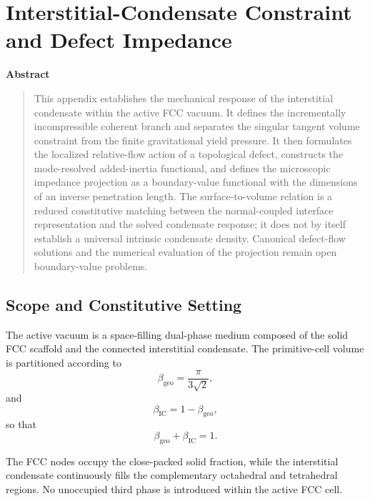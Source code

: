 \chapter[FCC Condensate Constraint and Defect Impedance]{Interstitial-Condensate Constraint and Defect Impedance}
\label{app:condensate_impedance}

\vspace{1em}
\begin{center}
    \textbf{Abstract}
\end{center}
\begin{quote}
\noindent This appendix establishes the mechanical response of the interstitial condensate within the active FCC vacuum. It defines the incrementally incompressible coherent branch and separates the singular tangent volume constraint from the finite gravitational yield pressure. It then formulates the localized relative-flow action of a topological defect, constructs the mode-resolved added-inertia functional, and defines the microscopic impedance projection as a boundary-value functional with the dimensions of an inverse penetration length. The surface-to-volume relation is a reduced constitutive matching between the normal-coupled interface representation and the solved condensate response; it does not by itself establish a universal intrinsic condensate density. Canonical defect-flow solutions and the numerical evaluation of the projection remain open boundary-value problems.
\end{quote}
\vspace{2em}

\section{Scope and Constitutive Setting}

The active vacuum is a space-filling dual-phase medium composed of the solid FCC scaffold and the connected interstitial condensate. The primitive-cell volume is partitioned according to
\begin{equation}
    \beta_{\mathrm{geo}} = \frac{\pi}{3\sqrt{2}},
\end{equation}
and
\begin{equation}
    \beta_{\mathrm{IC}} = 1 - \beta_{\mathrm{geo}},
\end{equation}
so that
\begin{equation}
    \beta_{\mathrm{geo}} + \beta_{\mathrm{IC}} = 1.
\end{equation}

The FCC nodes occupy the close-packed solid fraction, while the interstitial condensate continuously fills the complementary octahedral and tetrahedral regions. No unoccupied third phase is introduced within the active FCC cell.

